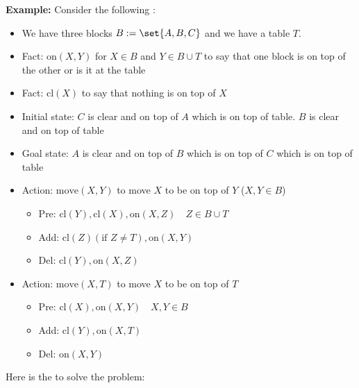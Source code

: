 \textbf{Example: }
Consider the following :
\begin{itemize}
    \item We have three blocks $B := \set{A,B,C}$ and we have a table $T$.
    \item Fact: $\text{on}(X,Y)$ for $X \in B$ and $Y \in B \cup T$ to say that one block is on top of the other or is it at the table
    \item Fact: $\text{cl}(X)$ to say that nothing is on top of $X$
    \item Initial state: $C$ is clear and on top of $A$ which is on top of table. $B$ is clear and on top of table
    \item Goal state: $A$ is clear and on top of $B$ which is on top of $C$ which is on top of table 
    \item Action: $\text{move}(X,Y)$ to move $X$ to be on top of $Y$ ($X,Y \in B$)
    \begin{itemize}
        \item Pre: $\text{cl}(Y), \text{cl}(X), \text{on}(X,Z) \quad Z \in B \cup T$
        \item Add: $\text{cl}(Z) (\text{if }Z \neq T), \text{on}(X,Y)$
        \item Del: $\text{cl}(Y), \text{on}(X,Z)$
    \end{itemize}
    \item Action: $\text{move}(X,T)$ to move $X$ to be on top of $T$
    \begin{itemize}
        \item Pre: $\text{cl}(X), \text{on}(X,Y) \quad X,Y \in B$
        \item Add: $\text{cl}(Y), \text{on}(X,T)$
        \item Del: $\text{on}(X,Y)$
    \end{itemize}
\end{itemize}

Here is the  to solve the problem:

